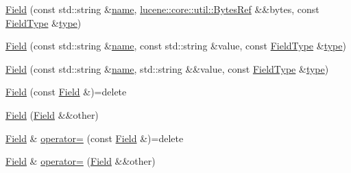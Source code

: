 \begin{DoxyCompactItemize}
\item 
\mbox{\hyperlink{classlucene_1_1core_1_1document_1_1Field_a53623937bdf694c7d4e359842b9c7673}{Field}} (const std\+::string \&\mbox{\hyperlink{classlucene_1_1core_1_1document_1_1Field_a52f673f3b3abb14b180f5159f4726537}{name}}, \mbox{\hyperlink{classlucene_1_1core_1_1util_1_1BytesRef}{lucene\+::core\+::util\+::\+Bytes\+Ref}} \&\&bytes, const \mbox{\hyperlink{classlucene_1_1core_1_1document_1_1FieldType}{Field\+Type}} \&\mbox{\hyperlink{classlucene_1_1core_1_1document_1_1Field_a7d5849d933ebde73422710069643ccff}{type}})
\item 
\mbox{\hyperlink{classlucene_1_1core_1_1document_1_1Field_af5870317c74d273ed0afd4715904a9e5}{Field}} (const std\+::string \&\mbox{\hyperlink{classlucene_1_1core_1_1document_1_1Field_a52f673f3b3abb14b180f5159f4726537}{name}}, const std\+::string \&value, const \mbox{\hyperlink{classlucene_1_1core_1_1document_1_1FieldType}{Field\+Type}} \&\mbox{\hyperlink{classlucene_1_1core_1_1document_1_1Field_a7d5849d933ebde73422710069643ccff}{type}})
\item 
\mbox{\hyperlink{classlucene_1_1core_1_1document_1_1Field_aaa472d50639e11ca10e5e06fe07fb87c}{Field}} (const std\+::string \&\mbox{\hyperlink{classlucene_1_1core_1_1document_1_1Field_a52f673f3b3abb14b180f5159f4726537}{name}}, std\+::string \&\&value, const \mbox{\hyperlink{classlucene_1_1core_1_1document_1_1FieldType}{Field\+Type}} \&\mbox{\hyperlink{classlucene_1_1core_1_1document_1_1Field_a7d5849d933ebde73422710069643ccff}{type}})
\item 
\mbox{\hyperlink{classlucene_1_1core_1_1document_1_1Field_a9759aeef777d122b3a14ea237b9996df}{Field}} (const \mbox{\hyperlink{classlucene_1_1core_1_1document_1_1Field}{Field}} \&)=delete
\item 
\mbox{\hyperlink{classlucene_1_1core_1_1document_1_1Field_a84c8c8edfd1576cdc1adcf6f3c38b57f}{Field}} (\mbox{\hyperlink{classlucene_1_1core_1_1document_1_1Field}{Field}} \&\&other)
\item 
\mbox{\hyperlink{classlucene_1_1core_1_1document_1_1Field}{Field}} \& \mbox{\hyperlink{classlucene_1_1core_1_1document_1_1Field_a9a165fa3cc612d355b6f3ef5deb87d50}{operator=}} (const \mbox{\hyperlink{classlucene_1_1core_1_1document_1_1Field}{Field}} \&)=delete
\item 
\mbox{\hyperlink{classlucene_1_1core_1_1document_1_1Field}{Field}} \& \mbox{\hyperlink{classlucene_1_1core_1_1document_1_1Field_ac2fbc0a1ae50f0e7452b90687aa0be78}{operator=}} (\mbox{\hyperlink{classlucene_1_1core_1_1document_1_1Field}{Field}} \&\&other)

\end{DoxyCompactItemize}
